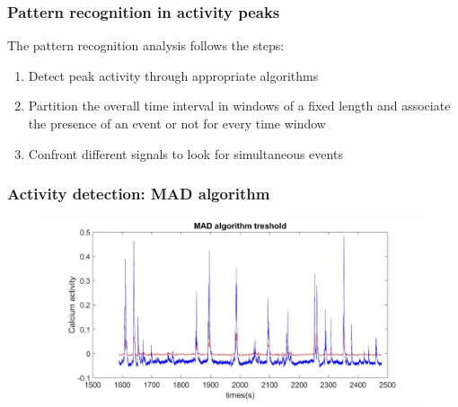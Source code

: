 \documentclass{beamer}
\begin{document}
\begin{frame}
\frametitle{Pattern recognition in activity peaks }


The pattern recognition analysis follows the steps: \vspace{1.4 cm}

\begin{enumerate}
	
	\item Detect peak activity through appropriate algorithms  \vspace{0.7 cm}
	
	\item Partition the overall time interval in windows of a fixed length and associate the presence of an event or not for every time window  \vspace{0.7 cm}
	
	\item Confront different signals to look for simultaneous events
	
\end{enumerate}
\end{frame}


\begin{frame}
\frametitle{Activity detection: MAD algorithm}

\begin{figure}[H]
	\begin{center}
		\hspace*{-1.3cm}
		\includegraphics[scale=.30]{MAD.jpg} 
	\end{center}  
	
	
\end{figure}

\end{frame}
\end{document}
